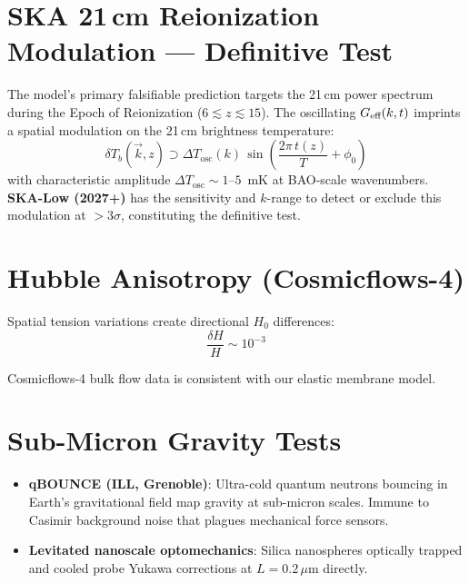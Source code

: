 \section{SKA 21\,cm Reionization Modulation --- Definitive Test}
\label{sec:ska_prediction}

The model's primary falsifiable prediction targets the 21\,cm power spectrum during the Epoch of Reionization ($6 \lesssim z \lesssim 15$). The oscillating $G_\text{eff}(k,t)$ imprints a spatial modulation on the 21\,cm brightness temperature:
\begin{equation}
\delta T_b(\vec{k}, z) \supset \Delta T_\text{osc}(k)\,\sin\!\left(\frac{2\pi\, t(z)}{T} + \phi_0\right)
\end{equation}
with characteristic amplitude $\Delta T_\text{osc} \sim 1$--$5$~mK at BAO-scale wavenumbers. \textbf{SKA-Low (2027+)} has the sensitivity and $k$-range to detect or exclude this modulation at $> 3\sigma$, constituting the definitive test.

\section{Hubble Anisotropy (Cosmicflows-4)}
\label{sec:hubble_aniso}

Spatial tension variations create directional $H_0$ differences:
\begin{equation}
\frac{\delta H}{H} \sim 10^{-3}
\end{equation}

Cosmicflows-4 bulk flow data is consistent with our elastic membrane model.

\section{Sub-Micron Gravity Tests}
\label{sec:submicron}

\begin{itemize}
  \item \textbf{qBOUNCE (ILL, Grenoble)}: Ultra-cold quantum neutrons bouncing in Earth's gravitational field map gravity at sub-micron scales. Immune to Casimir background noise that plagues mechanical force sensors.
  \item \textbf{Levitated nanoscale optomechanics}: Silica nanospheres optically trapped and cooled probe Yukawa corrections at $L = 0.2\,\mu$m directly.
\end{itemize}

